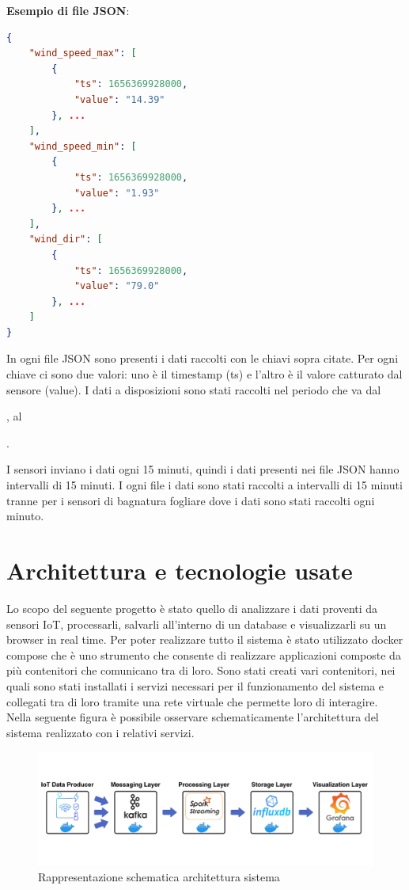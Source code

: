 \documentclass{article}
\begin{document}
\textbf{Esempio di file JSON}:
\begin{lstlisting}[language=json,firstnumber=1]
{
    "wind_speed_max": [
        {
            "ts": 1656369928000,
            "value": "14.39"
        }, ...
    ],
    "wind_speed_min": [
        {
            "ts": 1656369928000,
            "value": "1.93"
        }, ...
    ],
    "wind_dir": [
        {
            "ts": 1656369928000,
            "value": "79.0"
        }, ...
    ]
}
\end{lstlisting}

In ogni file JSON sono presenti i dati raccolti con le chiavi sopra citate. Per ogni chiave ci sono due valori: uno è il timestamp (ts) e l'altro è il valore catturato dal sensore (value). I dati a disposizioni sono stati raccolti nel periodo che va dal \date{01/04/2022}, al \date{27/04/2022}. 

I sensori inviano i dati ogni 15 minuti, quindi i dati presenti nei file JSON hanno intervalli di 15 minuti. I ogni file i dati sono stati raccolti a intervalli di 15 minuti tranne per i sensori di bagnatura fogliare dove i dati sono stati raccolti ogni minuto.

\newpage
\section{Architettura e tecnologie usate}
Lo scopo del seguente progetto è stato quello di analizzare i dati proventi da sensori IoT, processarli, salvarli all'interno di un database e visualizzarli su un browser in real time.
Per poter realizzare tutto il sistema è stato utilizzato docker compose che è uno strumento che consente di realizzare applicazioni composte da più contenitori che comunicano tra di loro. Sono stati creati vari contenitori, nei quali sono stati installati i servizi necessari per il funzionamento del sistema e collegati tra di loro tramite una rete virtuale che permette loro di interagire.
Nella seguente figura è possibile osservare schematicamente l'architettura del sistema realizzato con i relativi servizi.

\begin{figure}[H]
\includegraphics[width=1\linewidth]{Schema-Architettura-1}
\centering
\caption*{Rappresentazione schematica architettura sistema}
\label{fig:bytepost}
\end{figure}
\end{document}
